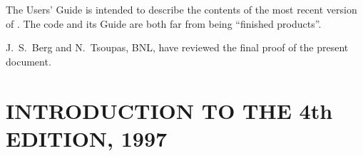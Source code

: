 \bigskip

\noindent  The Users' Guide is intended  to describe the contents of the most
recent version of \zgou. The code and its Guide are  both far from being  ``finished products''. 

\bigskip

\noindent J.~S.~Berg and N.~Tsoupas, BNL, have reviewed the final proof of the present document. 


\newpage
\clearemptydoublepage

                                  \section*{INTRODUCTION TO THE 4th  EDITION, 1997}

